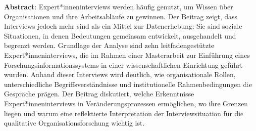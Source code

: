 \textbf{Abstract}: Expert*inneninterviews werden häufig genutzt, um
Wissen über Organisationen und ihre Arbeitsabläufe zu gewinnen. Der
Beitrag zeigt, dass Interviews jedoch mehr sind als ein Mittel zur
Datenerhebung: Sie sind soziale Situationen, in denen Bedeutungen
gemeinsam entwickelt, ausgehandelt und begrenzt werden. Grundlage der
Analyse sind zehn leitfadengestützte Expert*inneninterviews, die im
Rahmen einer Masterarbeit zur Einführung eines
Forschungsinformationssystems in einer wissenschaftlichen Einrichtung
geführt wurden. Anhand dieser Interviews wird deutlich, wie
organisationale Rollen, unterschiedliche Begriffsverständnisse und
institutionelle Rahmenbedingungen die Gespräche prägen. Der Beitrag
diskutiert, welche Erkenntnisse Expert*inneninterviews in
Veränderungsprozessen ermöglichen, wo ihre Grenzen liegen und warum eine
reflektierte Interpretation der Interviewsituation für die qualitative
Organisationsforschung wichtig ist.
